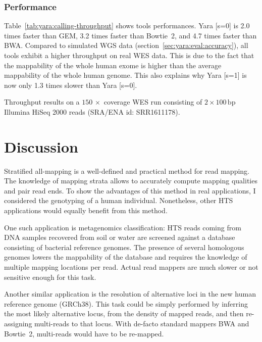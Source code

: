 \subsubsection{Performance}

Table~\ref{tab:yara:calling-throughput} shows tools performances.
Yara [s=0] is 2.0 times faster than GEM, 3.2 times faster than Bowtie~2, and 4.7 times faster than BWA.
Compared to simulated WGS data (section~\ref{sec:yara:eval:accuracy}), all tools exhibit a higher throughput on real WES data.
This is due to the fact that the mappability of the whole human exome is higher than the average mappability of the whole human genome.
This also explains why Yara [s=1] is now only 1.3 times slower than Yara [s=0].

\begin{table}[b]
\begin{center}
\caption[Yara throughput on whole exome sequencing data -- Illumina HiSeq 2000]{Throughput results on a $150\, \times$ coverage WES run consisting of $2 \times 100\,\text{bp}$ Illumina HiSeq 2000 reads (SRA/ENA id: SRR1611178).}
\sffamily

\label{tab:yara:calling-throughput}
\end{center}
\end{table}



\section{Discussion}

Stratified all-mapping is a well-defined and practical method for read mapping.
The knowledge of mapping strata allows to accurately compute mapping qualities and pair read ends.
To show the advantages of this method in real applications, I considered the genotyping of a human individual.
Nonetheless, other HTS applications would equally benefit from this method.

One such application is metagenomics classification:
HTS reads coming from DNA samples recovered from \eg soil or water are screened against a database consisting of bacterial reference genomes.
The presence of several homologous genomes lowers the mappability of the database and requires the knowledge of multiple mapping locations per read.
Actual read mappers are much slower or not sensitive enough for this task.

Another similar application is the resolution of alternative loci in the new human reference genome (GRCh38).
This task could be simply performed by inferring the most likely alternative locus, \eg from the density of mapped reads, and then re-assigning multi-reads to that locus.
With de-facto standard mappers BWA and Bowtie~2, multi-reads would have to be re-mapped.

